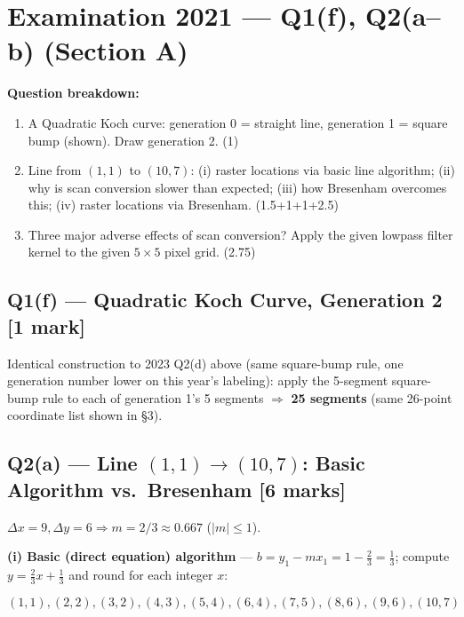 \documentclass[12pt, a4paper]{article}
\newenvironment{solutionbox}{\begin{mdframed}[style=solutionframe]}{\end{mdframed}}
\newenvironment{answerbox}{\begin{mdframed}[style=answerframe]}{\end{mdframed}}
\begin{document}
\section{Examination 2021 --- Q1(f), Q2(a--b) (Section A)}
\begin{solutionbox}
\textbf{Question breakdown:}
\begin{enumerate}[noitemsep]
  \item[Q1(f)] A Quadratic Koch curve: generation 0 = straight line, generation 1 = square bump (shown). Draw generation 2. (1)
  \item[Q2(a)] Line from $(1,1)$ to $(10,7)$: (i) raster locations via basic line algorithm; (ii) why is scan conversion slower than expected; (iii) how Bresenham overcomes this; (iv) raster locations via Bresenham. (1.5+1+1+2.5)
  \item[Q2(b)] Three major adverse effects of scan conversion? Apply the given lowpass filter kernel to the given $5\times5$ pixel grid. (2.75)
\end{enumerate}
\end{solutionbox}

\subsection*{Q1(f) --- Quadratic Koch Curve, Generation 2 [1 mark]}
\begin{answerbox}
Identical construction to 2023 Q2(d) above (same square-bump rule, one generation number lower on this year's labeling): apply the 5-segment square-bump rule to each of generation 1's 5 segments $\Rightarrow$ \textbf{25 segments} (same 26-point coordinate list shown in \S3).
\end{answerbox}

\subsection*{Q2(a) --- Line $(1,1)\to(10,7)$: Basic Algorithm vs.\ Bresenham [6 marks]}
$\Delta x=9,\Delta y=6\Rightarrow m=2/3\approx0.667$ ($|m|\le1$).

\textbf{(i) Basic (direct equation) algorithm} --- $b=y_1-mx_1=1-\frac23=\frac13$; compute $y=\frac23x+\frac13$ and round for each integer $x$:
\begin{answerbox}
$$(1,1),(2,2),(3,2),(4,3),(5,4),(6,4),(7,5),(8,6),(9,6),(10,7)$$
\end{answerbox}
\end{document}
